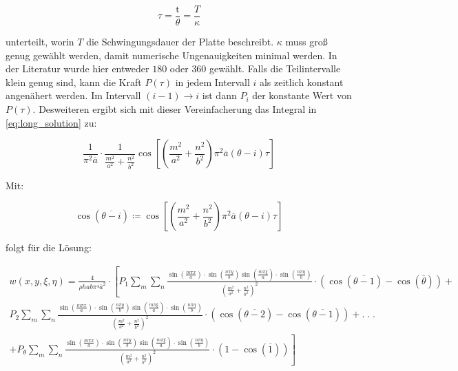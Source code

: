  \begin{equation}
 	\tau = \dfrac{\mbox{t}}{\theta}=\dfrac{T}{\kappa}
 \end{equation}
 
 unterteilt, worin $T$ die Schwingungsdauer der Platte beschreibt. $\kappa$ muss groß genug gewählt werden, damit numerische Ungenauigkeiten minimal werden. In der Literatur wurde hier entweder $180$ oder $360$ gewählt. Falls die Teilintervalle klein genug sind, kann die Kraft $P(\tau	)$ in jedem Intervall $i$ als zeitlich konstant angenähert werden. Im Intervall $(i-1) \rightarrow i$ ist dann $P_{i}$ der konstante Wert von $P(\tau)$. Desweiteren ergibt sich mit dieser Vereinfacherung das Integral in \ref{eq:long_solution} zu:
 
 \begin{equation}
 	\frac{1}{\pi^2\overline{a}} \cdot \frac{1}{\frac{m^2}{a^2}+\frac{n^2}{b^2}} \cos \left[ \left( \frac{m^2}{a^2}+\frac{n^2}{b^2} \right) \pi^2\overline{a}(\theta - i)\tau\right]
 \end{equation}  
 
Mit:

$$\cos\left(\overline{\theta - i}\right) \coloneqq \cos \left[ \left( \frac{m^2}{a^2}+\frac{n^2}{b^2} \right) \pi^2\overline{a}(\theta - i)\tau\right] $$

folgt für die Lösung:

\begin{equation}
\begin{multlined}
	w(x,y,\xi, \eta) = \frac{4}{\rho h a b \pi^4 \overline{a}^2} \cdot \left[ P_{1} \sum_m \sum_n \frac{\sin\left(\frac{m \pi x}{a}\right) \cdot \sin\left(\frac{n \pi y}{b}\right) \sin\left(\frac{m \pi \xi}{a}\right) \cdot \sin\left(\frac{n \pi \eta}{b}\right)	}{ \left( \frac{m^2}{a^2} + \frac{n^2}{b^2} \right)^2} \cdot \left( \cos(\overline{\theta-1}) - \cos(\overline{\theta}) \right) + \right. \\ P_{2} \sum_m \sum_n \frac{\sin\left(\frac{m \pi x}{a}\right) \cdot \sin\left(\frac{n \pi y}{b}\right) \sin\left(\frac{m \pi \xi}{a}\right) \cdot \sin\left(\frac{n \pi \eta}{b}\right)	}{ \left( \frac{m^2}{a^2} + \frac{n^2}{b^2} \right)^2} \cdot \left( \cos(\overline{\theta-2}) - \cos(\overline{\theta-1}) \right) + . \; . \; .\ \\ \left. + P_{\theta} \sum_m \sum_n \frac{\sin\left(\frac{m \pi x}{a}\right) \cdot \sin\left(\frac{n \pi y}{b}\right) \sin\left(\frac{m \pi \xi}{a}\right) \cdot \sin\left(\frac{n \pi \eta}{b}\right)	}{ \left( \frac{m^2}{a^2} + \frac{n^2}{b^2} \right)^2} \cdot \left( 1 - \cos(\overline{1}) \right) \right]
	\label{eq:horror}
\end{multlined}
\end{equation}


